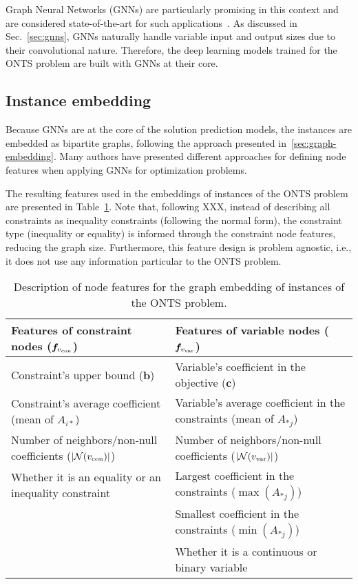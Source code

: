Graph Neural Networks (GNNs) are particularly promising in this context and are considered state-of-the-art for such applications~\cite{cappartCombinatorialOptimizationReasoning2022}.
As discussed in Sec.~\ref{sec:gnns}, GNNs naturally handle variable input and output sizes due to their convolutional nature.
Therefore, the deep learning models trained for the ONTS problem are built with GNNs at their core.

\subsection{Instance embedding}

Because GNNs are at the core of the solution prediction models, the instances are embedded as bipartite graphs, following the approach presented in~\ref{sec:graph-embedding}.
Many authors have presented different approaches for defining node features when applying GNNs for optimization problems.

The resulting features used in the embeddings of instances of the ONTS problem are presented in Table~\ref{tab:feature-desc}.
Note that, following XXX, instead of describing all constraints as inequality constraints (following the normal form), the constraint type (inequality or equality) is informed through the constraint node features, reducing the graph size. %
Furthermore, this feature design is problem agnostic, i.e., it does not use any information particular to the ONTS problem.

\begin{table}[h]
    \centering
    \begin{tabular}{p{7cm}|p{7cm}}
    \toprule
        Features of constraint nodes ($\bm{f}_{v_{\rm con}}$) & Features of variable nodes ($\bm{f}_{v_{\rm var}}$) \\
    \midrule
         Constraint's upper bound ($\bm{b}$)                     &  Variable's coefficient in the objective ($\bm{c}$)\\
         Constraint's average coefficient (mean of $A_{i*}$)     &  Variable's average coefficient in the constraints (mean of $A_{*j}$) \\
         Number of neighbors/non-null coefficients ($|\mathcal{N}(v_{\rm con})|$)    &  Number of neighbors/non-null coefficients ($|\mathcal{N}(v_{\rm var})|$) \\
         Whether it is an equality or an inequality constraint &  Largest coefficient in the constraints ($\max(A_{*j})$) \\
                                                                    &  Smallest coefficient in the constraints ($\min(A_{*j})$) \\
                                                                    &  Whether it is a continuous or binary variable \\
    \bottomrule
    \end{tabular}
    \caption{Description of node features for the graph embedding of instances of the ONTS problem.}
    \label{tab:feature-desc}
\end{table}


